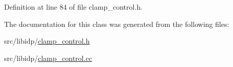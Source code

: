Definition at line 84 of file clamp\_\-control.h.



The documentation for this class was generated from the following files:\begin{DoxyCompactItemize}
\item 
src/libidp/\hyperlink{clamp__control_8h}{clamp\_\-control.h}\item 
src/libidp/\hyperlink{clamp__control_8cc}{clamp\_\-control.cc}\end{DoxyCompactItemize}
